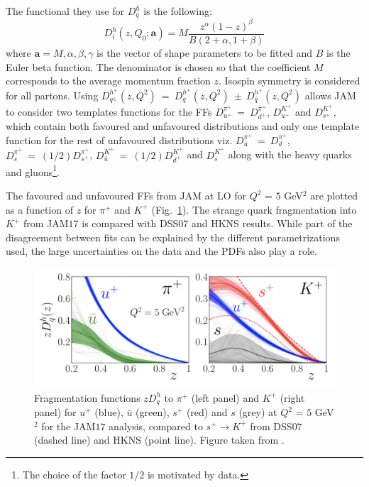 The functional they use for $D^h_q$ is the following:
%
\begin{equation}
  D^h_i (z,Q_0;\textbf{a}) = M \frac{z^{\alpha}(1-z)^{\beta}}{B(2+\alpha,1+\beta)}
  \label{eq:JAMparam}
\end{equation}
%
where $\textbf{a} = {M,\alpha,\beta,\gamma}$ is the vector of shape parameters to be fitted and $B$ is the Euler beta function. The denominator is chosen so that the coefficient $M$ corresponds to the average momentum fraction $z$. Isospin symmetry is considered for all partons. Using $D^{h^{+}}_{q^{\pm}}(z,Q^2)~=~D^{h^{+}}_{q}(z,Q^2)~\pm~D^{h^{+}}_{\bar{q}}(z,Q^2)$ allows JAM to consider two templates functions for the FFs $D^{\pi^{+}}_{u^{+}}~=~D^{\pi^{+}}_{d^{+}}$, $D^{K^{+}}_{u^{+}}$ and $D^{K^{+}}_{s^{+}}$, which contain both favoured and unfavoured distributions and only one template function for the rest of unfavoured distributions viz. $D^{\pi^{+}}_{\bar{u}}~=~D^{\pi^{+}}_{d}$, $D^{\pi^{+}}_{s}~=~(1/2)D^{\pi^{+}}_{s^{+}}$, $D^{K^{+}}_{\bar{u}}~=~(1/2)D^{K^{+}}_{d^{+}}$ and $D^{K^{+}}_{s}$ along with the heavy quarks and gluons\footnote{The choice of the factor $1/2$ is motivated by data.}.

The favoured and unfavoured FFs from JAM at LO for $Q^2$ = $5$ GeV$^2$ are plotted as a function of $z$ for $\pi^+$ and $K^+$ (Fig.~\ref{pic:JAMcomp}). The strange quark fragmentation into $K^+$ from JAM$17$ is compared with DSS$07$ and HKNS results. While part of the disagreement between fits can be explained by the different parametrizations used, the large uncertainties on the data and the PDFs also play a role.

\begin{figure}[!h]
  \centering
	\includegraphics[scale=0.7]{./gfx/JAMcomp.png}
	\caption{Fragmentation functions $zD^h_q$ to $\pi^+$ (left panel) and $K^+$ (right panel) for $u^+$ (blue), $\bar{u}$ (green), $s^+$ (red) and $s$ (grey) at $Q^2$ = $5$ GeV$^2$ for the JAM$17$ analysis, compared to $s^+ \rightarrow K^+$ from DSS$07$ (dashed line) and HKNS (point line). Figure taken from \cite{JAM}.}
	\label{pic:JAMcomp}
\end{figure}

